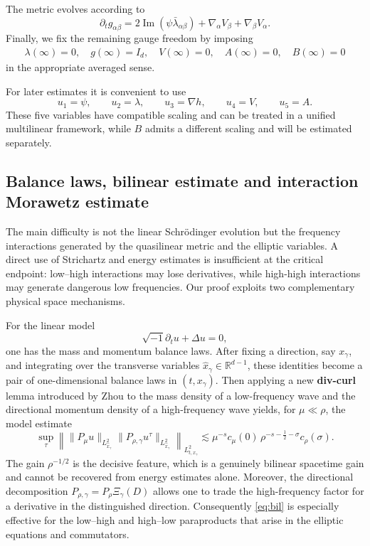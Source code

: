 \documentclass[11pt,letterpaper,reqno]{amsart}
\numberwithin{equation}{section}
\newcommand{\R}{\mathbb R}
\theoremstyle{definition}
\theoremstyle{remark}
\newcommand{\pa}{\partial}
\begin{document}
The metric evolves according to
\begin{equation}
    \pa_t g_{\alpha\beta} =  2 \operatorname{Im}(\psi \bar{\lambda}_{\alpha \beta}) + \nabla_\alpha V_\beta + \nabla_\beta V_\alpha.\label{dt_g}
\end{equation}
Finally, we fix the remaining gauge freedom by imposing
\begin{align}
    \lambda(\infty)=0, \quad g(\infty)=I_d, \quad V(\infty)=0, \quad A(\infty)=0, \quad B(\infty)=0 \label{cond_inf}
\end{align}
in the appropriate averaged sense.

For later estimates it is convenient to use
\[
 u_1=\psi,\qquad u_2=\lambda,\qquad
 u_3=\nabla h,\qquad u_4=V,\qquad u_5=A.
\]
These five variables have compatible scaling and can be treated in a unified
multilinear framework, while $B$ admits a different scaling and will be estimated separately.



\subsection{Balance laws, bilinear estimate and interaction Morawetz estimate}

The main difficulty is not the linear Schr\"odinger evolution but the
frequency interactions generated by the quasilinear metric and the elliptic
variables.  A direct use of Strichartz and energy estimates is insufficient at the
critical endpoint: low--high interactions may lose derivatives, while
high-high interactions may generate dangerous low frequencies.  Our proof
exploits two complementary physical space mechanisms.


For the linear model
\[
 \sqrt{-1}\partial_tu+\Delta u=0,
\]
one has the mass and momentum balance laws.  After fixing a direction, say
$x_\gamma$, and integrating over the transverse variables
$\widehat{x}_{\gamma}\in\R^{d-1}$, these identities become a pair of one-dimensional
balance laws in $(t,x_\gamma)$.  Then applying a new \textbf{div-curl} lemma introduced by Zhou \cite{Zhou1}
to the mass density of a low-frequency wave and the directional momentum density
of a high-frequency wave yields, for $\mu\ll\rho$, the model estimate
\begin{equation}\label{eq:bil}
 \sup_\tau
 \left\|
   \|P_\mu u\|_{L^2_{\widehat{x}_{\gamma}}}
   \|P_{\rho,\gamma}u^\tau\|_{L^2_{\widehat{x}_{\gamma}}}
 \right\|_{L^2_{t,x_\gamma}}
 \lesssim
 \mu^{-s}c_\mu(0)\,
 \rho^{-s-\frac12-\sigma}c_\rho(\sigma).
\end{equation}
The gain $\rho^{-1/2}$ is the decisive feature, which is a genuinely bilinear
spacetime gain and cannot be recovered from energy estimates alone.  Moreover,
the directional decomposition $P_{\rho,\gamma}=P_\rho\Xi_\gamma(D)$ allows one to
trade the high-frequency factor for a derivative in the distinguished direction.
Consequently \eqref{eq:bil} is especially effective for the low--high and
high--low paraproducts that arise in the elliptic equations and commutators.
\end{document}
